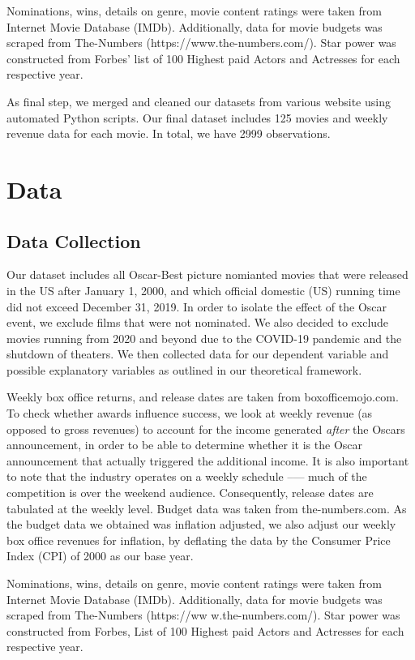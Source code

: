\documentclass[10.7pt]{article} %
\begin{document}
Nominations, wins, details on genre, movie content ratings were taken from Internet Movie Database (IMDb). Additionally, data for movie budgets was scraped from The-Numbers (https://www.the-numbers.com/). Star power was constructed from Forbes' list of 100 Highest paid Actors and Actresses for each respective year. 

As final step, we merged and cleaned our datasets from various website using automated Python scripts. Our final dataset includes 125 movies and weekly revenue data for each movie. In total, we have 2999 observations. 

\setlength{\parindent}{20pt}

\section{Data}
\subsection{Data Collection} 
Our dataset includes all Oscar-Best picture nomianted movies that were released in the US after January 1, 2000, and which official domestic (US) running time did not exceed December 31, 2019. In order to isolate the effect of the Oscar event, we exclude films that were not nominated. We also decided to exclude movies running from 2020 and beyond due to the COVID-19 pandemic and the shutdown of theaters. We then collected data for our dependent variable and possible explanatory variables as outlined in our theoretical framework. 

Weekly box office returns, and release dates are taken from boxofficemojo.com. To check whether awards influence success, we look at weekly revenue (as opposed to gross revenues) to account for the income generated \textit{after} the Oscars announcement, in order to be able to determine whether it is the Oscar announcement that actually triggered the additional income. It is also important to note that the industry operates on a weekly schedule --— much of the competition is over the weekend audience. Consequently, release dates are tabulated at the weekly level. Budget data was taken from the-numbers.com. 
As the budget data we obtained was inflation adjusted, we also adjust our weekly box office revenues for inflation, by deflating the data by the Consumer Price Index (CPI) of 2000 as our base year. 

Nominations, wins, details on genre, movie content ratings were taken from Internet Movie Database (IMDb). Additionally, data for movie budgets was scraped from The-Numbers (https://ww w.the-numbers.com/). Star power was constructed from Forbes, List of 100 Highest paid Actors and Actresses for each respective year. 
\end{document}
